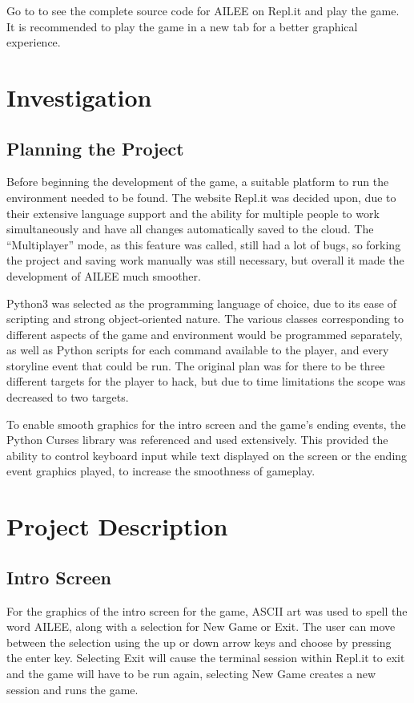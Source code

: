 \documentclass[conference]{IEEEtran}
\begin{document}
Go to \cite{b1} to see the complete source code for AILEE on Repl.it and play the game. It is recommended to play the game in a new tab for a better graphical experience.

\section{Investigation}

\subsection{Planning the Project}

Before beginning the development of the game, a suitable platform to run the environment needed to be found. The website Repl.it was decided upon, due to their extensive language support and the ability for multiple people to work simultaneously and have all changes automatically saved to the cloud. \cite{b2} The “Multiplayer” mode, as this feature was called, still had a lot of bugs, so forking the project and saving work manually was still necessary, but overall it made the development of AILEE much smoother. 

Python3 was selected as the programming language of choice, due to its ease of scripting and strong object-oriented nature. The various classes corresponding to different aspects of the game and environment would be programmed separately, as well as Python scripts for each command available to the player, and every storyline event that could be run. The original plan was for there to be three different targets for the player to hack, but due to time limitations the scope was decreased to two targets.
    
To enable smooth graphics for the intro screen and the game’s ending events, the Python Curses library was referenced and used extensively. \cite{b3} This provided the ability to control keyboard input while text displayed on the screen or the ending event graphics played, to increase the smoothness of gameplay. 

\section{Project Description}

\subsection{Intro Screen}\label{AA}
For the graphics of the intro screen for the game, ASCII art was used to spell the word AILEE, along with a selection for New Game or Exit. The user can move between the selection using the up or down arrow keys and choose by pressing the enter key. Selecting Exit will cause the terminal session within Repl.it to exit and the game will have to be run again, selecting New Game creates a new session and runs the game. 
\end{document}
